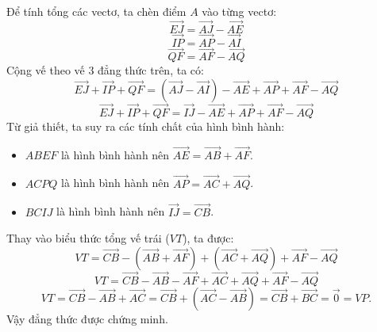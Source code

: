 \begin{vd}
{\begin{center}
		\end{center}
		Để tính tổng các vectơ, ta chèn điểm $A$ vào từng vectơ:
		$$ \overrightarrow{EJ} = \overrightarrow{AJ} - \overrightarrow{AE} $$
		$$ \overrightarrow{IP} = \overrightarrow{AP} - \overrightarrow{AI} $$
		$$ \overrightarrow{QF} = \overrightarrow{AF} - \overrightarrow{AQ} $$
		Cộng vế theo vế $3$ đẳng thức trên, ta có:
		$$ \overrightarrow{EJ} + \overrightarrow{IP} + \overrightarrow{QF} = (\overrightarrow{AJ} - \overrightarrow{AI}) - \overrightarrow{AE} + \overrightarrow{AP} + \overrightarrow{AF} - \overrightarrow{AQ} $$
		$$ \overrightarrow{EJ} + \overrightarrow{IP} + \overrightarrow{QF} = \overrightarrow{IJ} - \overrightarrow{AE} + \overrightarrow{AP} + \overrightarrow{AF} - \overrightarrow{AQ} $$
		Từ giả thiết, ta suy ra các tính chất của hình bình hành:
		\begin{itemize}
			\item $ABEF$ là hình bình hành nên $\overrightarrow{AE} = \overrightarrow{AB} + \overrightarrow{AF}$.
			\item $ACPQ$ là hình bình hành nên $\overrightarrow{AP} = \overrightarrow{AC} + \overrightarrow{AQ}$.
			\item $BCIJ$ là hình bình hành nên $\overrightarrow{IJ} = \overrightarrow{CB}$.
		\end{itemize}
		Thay vào biểu thức tổng vế trái ($VT$), ta được:
		$$ VT = \overrightarrow{CB} - (\overrightarrow{AB} + \overrightarrow{AF}) + (\overrightarrow{AC} + \overrightarrow{AQ}) + \overrightarrow{AF} - \overrightarrow{AQ} $$
		$$ VT = \overrightarrow{CB} - \overrightarrow{AB} - \overrightarrow{AF} + \overrightarrow{AC} + \overrightarrow{AQ} + \overrightarrow{AF} - \overrightarrow{AQ} $$
		$$ VT = \overrightarrow{CB} - \overrightarrow{AB} + \overrightarrow{AC} = \overrightarrow{CB} + (\overrightarrow{AC} - \overrightarrow{AB}) = \overrightarrow{CB} + \overrightarrow{BC} = \vec{0} = VP. $$
		Vậy đẳng thức được chứng minh.
	}
\end{vd} 



